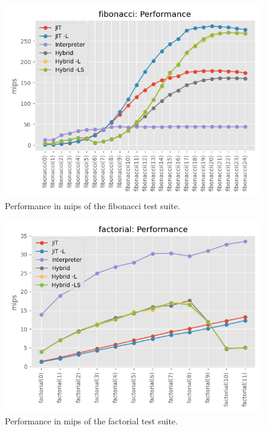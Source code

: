 \begin{figure}[H]
    \centering
    \includegraphics[scale=0.75]{output/graphs/tests/all/fibonacci/mips.png}
    \caption{Performance in mips of the fibonacci test suite.}
    \label{figure:fibonacci-mips}
\end{figure}


\begin{figure}[H]
    \centering
    \includegraphics[scale=0.75]{output/graphs/tests/all/factorial/mips.png}
    \caption{Performance in mips of the factorial test suite.}
    \label{figure:factorial-mips}
\end{figure}